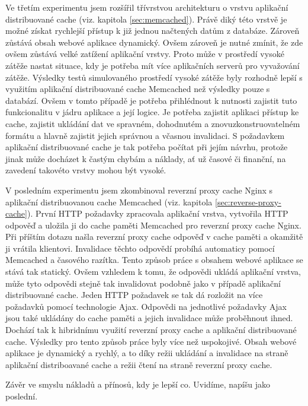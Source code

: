 \documentclass[12pt]{article}
\begin{document}
Ve třetím experimentu jsem rozšířil třívrstvou architekturu o vrstvu aplikační distribuované cache (viz. kapitola \ref{sec:memcached}). Právě diký této vrstvě je možné získat rychlejší přístup k již jednou načtených datům z databáze. Zároveň zůstává obsah webové aplikace dynamický. Ovšem zároveň je nutné zmínit, že zde ovšem zůstává velké zatížení aplikační vrstvy. Proto může v prostředí vysoké zátěže nastat situace, kdy je potřeba mít více aplikačních serverů pro vyvažování zátěže. Výsledky testů simulovaného prostředí vysoké zátěže byly rozhodně lepší s využitím aplikační distribuované cache Memcached než výsledky pouze s databází. Ovšem v tomto případě je potřeba přihlédnout k nutnosti zajistit tuto funkcionalitu v jádru aplikace a její logice. Je potřeba zajistit aplikaci přístup ke cache, zajistit ukládání dat ve spravném, dohodnutém a znovuzkonstruovatelném formátu a hlavně zajistit jejich správnou a včasnou invalidaci. S požadavkem aplikační distribuované cache je tak potřeba počítat při jejím návrhu, protože jinak může docházet k častým chybám a náklady, ať už časové či finanční, na zavedení takovéto vrstvy mohou být vysoké.

V posledním experimentu jsem zkombinoval reverzní proxy cache Nginx s aplikační distribuovanou cache Memcached (viz. kapitola \ref{sec:reverse-proxy-cache}). První HTTP požadavky zpracovala aplikační vrstva, vytvořila HTTP odpověď a uložila ji do cache paměti Memcached pro reverzní proxy cache Nginx. Při příštím dotazu našla reverzní proxy cache odpověď v cache paměti a okamžitě ji vrátila klientovi. Invalidace těchto odpovědí probíhá automaticy pomocí Memcached a časového razítka. Tento způsob práce s obsahem webové aplikace se stává tak statický. Ovšem vzhledem k tomu, že odpovědi ukládá aplikační vrstva, může tyto odpovědi stejně tak invalidovat podobně jako v případě aplikační distribuované cache. Jeden HTTP požadavek se tak dá rozložit na více požadavků pomocí technologie Ajax. Odpovědi na jednotlivé požadavky Ajax jsou také ukládány do cache paměti a jejich invalidace může proběhnout ihned. Dochází tak k hibridnímu využití reverzní proxy cache a aplikační distribuované cache. Výsledky pro tento způsob práce byly více než uspokojivé. Obsah webové aplikace je dynamický a rychlý, a to díky režii ukládání a invalidace na straně aplikační distriboavané cache a režii čtení na straně reverzní proxy cache.

Závěr ve smyslu nákladů a přínosů, kdy je lepší co. Uvidíme, napíšu jako poslední.
\end{document}
